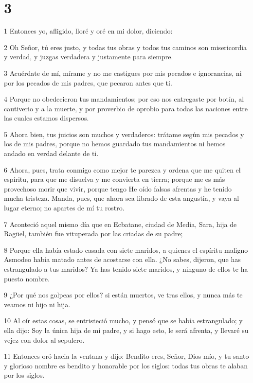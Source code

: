 \chapter{3}

\par 1 Entonces yo, afligido, lloré y oré en mi dolor, diciendo:
\par 2 Oh Señor, tú eres justo, y todas tus obras y todos tus caminos son misericordia y verdad, y juzgas verdadera y justamente para siempre.
\par 3 Acuérdate de mí, mírame y no me castigues por mis pecados e ignorancias, ni por los pecados de mis padres, que pecaron antes que ti.
\par 4 Porque no obedecieron tus mandamientos; por eso nos entregaste por botín, al cautiverio y a la muerte, y por proverbio de oprobio para todas las naciones entre las cuales estamos dispersos.
\par 5 Ahora bien, tus juicios son muchos y verdaderos: trátame según mis pecados y los de mis padres, porque no hemos guardado tus mandamientos ni hemos andado en verdad delante de ti.
\par 6 Ahora, pues, trata conmigo como mejor te parezca y ordena que me quiten el espíritu, para que me disuelva y me convierta en tierra; porque me es más provechoso morir que vivir, porque tengo He oído falsas afrentas y he tenido mucha tristeza. Manda, pues, que ahora sea librado de esta angustia, y vaya al lugar eterno; no apartes de mí tu rostro.
\par 7 Aconteció aquel mismo día que en Ecbatane, ciudad de Media, Sara, hija de Ragüel, también fue vituperada por las criadas de su padre;
\par 8 Porque ella había estado casada con siete maridos, a quienes el espíritu maligno Asmodeo había matado antes de acostarse con ella. ¿No sabes, dijeron, que has estrangulado a tus maridos? Ya has tenido siete maridos, y ninguno de ellos te ha puesto nombre.
\par 9 ¿Por qué nos golpeas por ellos? si están muertos, ve tras ellos, y nunca más te veamos ni hijo ni hija.
\par 10 Al oír estas cosas, se entristeció mucho, y pensó que se había estrangulado; y ella dijo: Soy la única hija de mi padre, y si hago esto, le será afrenta, y llevaré su vejez con dolor al sepulcro.
\par 11 Entonces oró hacia la ventana y dijo: Bendito eres, Señor, Dios mío, y tu santo y glorioso nombre es bendito y honorable por los siglos: todas tus obras te alaban por los siglos.
